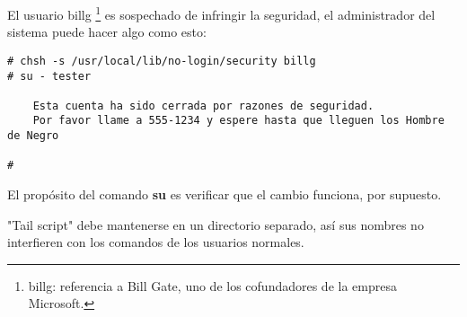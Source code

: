 El usuario billg
	\footnote{ billg: referencia a
	Bill Gate, uno de los cofundadores de la empresa Microsoft.} es sospechado
	de infringir la seguridad, el
administrador del sistema puede hacer algo como esto: 


\begin{verbatim}
# chsh -s /usr/local/lib/no-login/security billg
# su - tester

    Esta cuenta ha sido cerrada por razones de seguridad.
    Por favor llame a 555-1234 y espere hasta que lleguen los Hombre de Negro 

# 
\end{verbatim}


El propósito del comando \textbf{su} es verificar que el cambio
funciona, por supuesto.  

"Tail script" debe mantenerse en un directorio separado, así sus nombres
no interfieren con los comandos de los usuarios normales.







